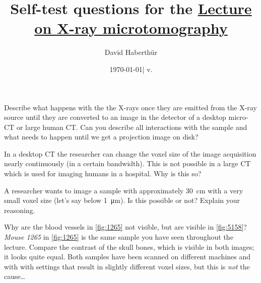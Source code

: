 \documentclass[a4paper]{exam}
\title{Self-test questions for the \href{https://ilias.unibe.ch/goto_ilias3_unibe_sess_2466944.html}{Lecture on X-ray microtomography}}
\author{David Haberthür}
\date{\today\xspace| v. \gitAbbrevHash}
\newcommand{\uct}{{\textmu}CT\xspace}%
\newcommand{\mct}{micro-CT\xspace}%
\begin{document}
\maketitle

\begin{questions}

\question Describe what happens with the the X-rays once they are emitted from the X-ray source until they are converted to an image in the detector of a desktop \mct or large human CT.
	Can you describe all interactions with the sample and what needs to happen until we get a projection image on disk?

\question In a desktop \uct the researcher can change the voxel size of the image acquisition nearly continuously (in a certain bandwidth).
	This is not possible in a large CT which is used for imaging humans in a hospital.
	Why is this so?

\question A researcher wants to image a sample with approximately \SI{30}{\centi\meter} with a very small voxel size (let's say below \SI{1}{\micro\meter}).
	Is this possible or not?
	Explain your reasoning.

\question Why are the blood vessels in \autoref{fig:1265} not visible, but are visible in \autoref{fig:5158}?
	\emph{Mouse 1265} in \autoref{fig:1265} is the same sample you have seen throughout the lecture.
	Compare the contrast of the skull bones, which is visible in both images; it looks quite equal.
	Both samples have been scanned on different machines and with with settings that result in slightly different voxel sizes, but this is \emph{not} the cause\ldots


\end{questions}
\end{document}
